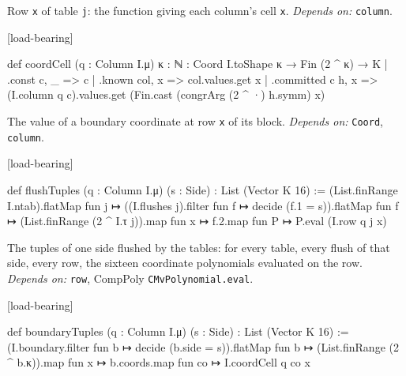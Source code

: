 Row \texttt{x} of table \texttt{j}: the function giving each column's cell \texttt{x}. \emph{Depends on:} \texttt{column}.

\par\medskip\noindent\textbf{}\hfill\textsf{\small [load-bearing]}\par\nopagebreak

\begin{leancode}
def coordCell (q : Column I.μ) {κ : ℕ} : Coord I.toShape κ → Fin (2 ^ κ) → K
  | .const c, _ => c
  | .known col, x => col.values.get x
  | .committed c h, x => (I.column q c).values.get (Fin.cast (congrArg (2 ^ ·) h.symm) x)
\end{leancode}


The value of a boundary coordinate at row \texttt{x} of its block. \emph{Depends on:} \texttt{Coord}, \texttt{column}.

\par\medskip\noindent\textbf{}\hfill\textsf{\small [load-bearing]}\par\nopagebreak

\begin{leancode}
def flushTuples (q : Column I.μ) (s : Side) : List (Vector K 16) :=
  (List.finRange I.ntab).flatMap fun j ↦
    ((I.flushes j).filter fun f ↦ decide (f.1 = s)).flatMap fun f ↦
      (List.finRange (2 ^ I.τ j)).map fun x ↦ f.2.map fun P ↦ P.eval (I.row q j x)
\end{leancode}


The tuples of one side flushed by the tables: for every table, every flush of that side, every row, the sixteen coordinate polynomials evaluated on the row. \emph{Depends on:} \texttt{row}, CompPoly \texttt{CMvPolynomial.\allowbreak{}eval}.

\par\medskip\noindent\textbf{}\hfill\textsf{\small [load-bearing]}\par\nopagebreak

\begin{leancode}
def boundaryTuples (q : Column I.μ) (s : Side) : List (Vector K 16) :=
  (I.boundary.filter fun b ↦ decide (b.side = s)).flatMap fun b ↦
    (List.finRange (2 ^ b.κ)).map fun x ↦ b.coords.map fun co ↦ I.coordCell q co x
\end{leancode}

